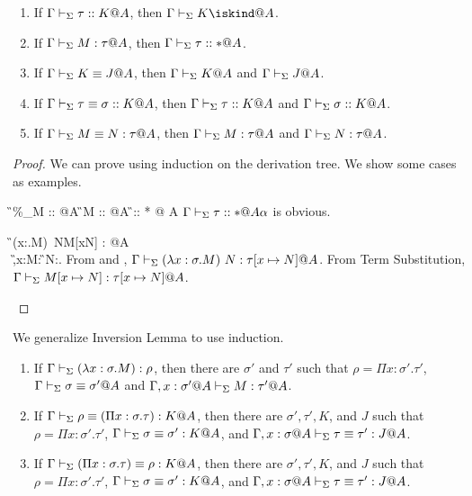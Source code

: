 \begin{lemma}[Agreement]
    \label{lemma:Agreement}
    \begin{enumerate}
        \item If \(\Gamma\vdash_\Sigma \tau::K@A\), then \(\G\V K\iskind@A \).
        \item If \(\G\V M:\tau@A\), then \(\Gamma\vdash_\Sigma \tau::*@A\).
        \item If \(\Gamma\vdash_\Sigma K\equiv J@A\), then \(\Gamma\vdash_\Sigma K @A\) and \(\Gamma\vdash_\Sigma J @A\).
        \item If \(\Gamma\vdash_\Sigma \tau\equiv \sigma :: K@A\), then \(\Gamma\vdash_\Sigma \tau::K@A\) and \(\Gamma\vdash_\Sigma \sigma::K@A\).
        \item If \(\G\V M\E N : \tau@A\), then \(\G\V M:\tau@A\) and \(\G\V N:\tau@A\).
    \end{enumerate}
\end{lemma}
\begin{proof}

    We can prove using induction on the derivation tree.
    We show some cases as examples.

    \begin{rneqncase}{\TCsp{}}{
            \G\V \%_\alpha M :: \tau @A\alpha {} \G\V M :: \tau @A  \G \V \tau :: * @ A\alpha
            }
            \( \Gamma \vdash_\Sigma \tau :: * @ A\alpha \) is obvious.
    \end{rneqncase}
    \begin{rneqncase}{\QBeta{}}{
            \G\V(\lambda x:\sigma.M)\ N\E M[x\mapsto N] : \tau[x \mapsto N]@A \\
            \G,x:\sigma@A\V M:\tau@A {} \G\V N:\sigma@A.
            }
            From \TAbs{} and \TApp, \( \Gamma\vdash_\Sigma(\lambda x:\sigma.M)\ N : \tau[x \mapsto N]@A \).
            From Term Substitution, \( \Gamma\vdash_\Sigma M[x\mapsto N] : \tau[x \mapsto N]@A \).
    \end{rneqncase}

\end{proof}

We generalize Inversion Lemma to use induction.
\begin{lemma}
    \begin{enumerate}
        \item If $\Gamma \vdash_\Sigma (\lambda x:\sigma.M) : \rho$, then there are $\sigma'$ and $\tau'$ such that
            $\rho = \Pi x:\sigma'.\tau'$, $\Gamma \vdash_\Sigma \sigma \equiv \sigma'@A$ and $\Gamma ,x:\sigma'@A\vdash_\Sigma M:\tau'@A$.
        \item If $\Gamma \vdash_\Sigma \rho \equiv (\Pi x:\sigma.\tau) : K @A$, then there are $\sigma', \tau', K$, and $J$ such that
            $\rho = \Pi x:\sigma'.\tau'$, $\Gamma \vdash_\Sigma \sigma \equiv \sigma' : K @A$, and $\G, x:\sigma@A\V \tau \E \tau' : J @A$.
        \item If $\Gamma \vdash_\Sigma (\Pi x:\sigma.\tau) \equiv \rho : K @A$, then there are $\sigma', \tau', K$, and $J$ such that
            $\rho = \Pi x:\sigma'.\tau'$, $\Gamma \vdash_\Sigma \sigma \equiv \sigma' : K @A$, and $\G, x:\sigma@A\V \tau \E \tau' : J @A$.
    \end{enumerate}
\end{lemma}

